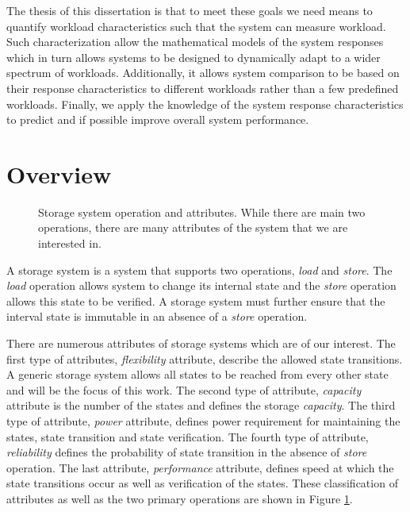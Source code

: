 
The thesis of this dissertation is that to meet these goals we need means to quantify workload characteristics such that the system can measure workload.
Such characterization allow the mathematical models of the system responses which in turn allows systems to be designed to dynamically adapt to a wider spectrum of workloads.
Additionally, it allows system comparison to be based on their response characteristics to different workloads rather than a few predefined workloads. 
Finally, we apply the knowledge of the system response characteristics to predict and if possible improve overall system performance.


\section{Overview}
\begin{figure}[!t]
\centering

\captionsetup{format=myformat}
\caption{Storage system operation and attributes. While there are main two operations, there are many attributes of the system that we are interested in.}
\label{fig:storageAttribute}
\end{figure}

A storage system is a system that supports two operations, \emph{load} and \emph{store}.
The \emph{load} operation allows system to change its internal state and the \emph{store} operation allows this state to be verified.
A storage system must further ensure that the interval state is immutable in an absence of a \emph{store} operation.

There are numerous attributes of storage systems which are of our interest.
The first type of attributes, \emph{flexibility} attribute, describe the allowed state transitions.
A generic storage system allows all states to be reached from every other state and will be the focus of this work.
The second type of attribute, \emph{capacity} attribute is the number of the states and defines the storage \emph{capacity}.
The third type of attribute, \emph{power} attribute, defines power requirement for maintaining the states, state transition and state verification.
The fourth type of attribute, \emph{reliability} defines the probability of state transition in the absence of \emph{store} operation.
The last attribute, \emph{performance} attribute, defines speed at which the state transitions occur as well as verification of the states.
These classification of attributes as well as the two primary operations are shown in Figure \ref{fig:storageAttribute}.

